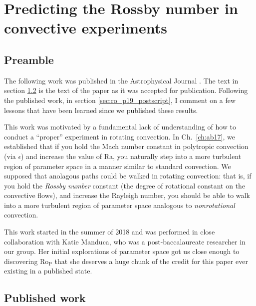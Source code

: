 \chapter{Predicting the Rossby number in convective experiments}
\label{ch:ro_p19}

\section{Preamble}
The following work was published in the Astrophysical Journal \citep{anders&all2019}.
The text in section \ref{sec:ro_p19_published} is the text of the paper as it was accepted for publication.
Following the published work, in section \ref{sec:ro_p19_postscript}, I comment on a few lessons that have been learned since we published these results.

This work was motivated by a fundamental lack of understanding of how to conduct a ``proper'' experiment in rotating convection.
In Ch.~\ref{ch:ab17}, we established that if you hold the Mach number constant in polytropic convection (via $\epsilon$) and increase the value of Ra, you naturally step into a more turbulent region of parameter space in a manner similar to standard \RB convection.
We supposed that anolagous paths could be walked in rotating convection: that is, if you hold the \emph{Rossby number} constant (the degree of rotational constant on the convective flows), and increase the Rayleigh number, you should be able to walk into a more turbulent region of parameter space analogous to \emph{nonrotational} \RB convection.

This work started in the summer of 2018 and was performed in close collaboration with Katie Manduca, who was a post-baccalaureate researcher in our group.
Her initial explorations of parameter space got us close enough to discovering Ro$_\text{P}$ that she deserves a huge chunk of the credit for this paper ever existing in a published state.

\section{Published work}
\label{sec:ro_p19_published}

